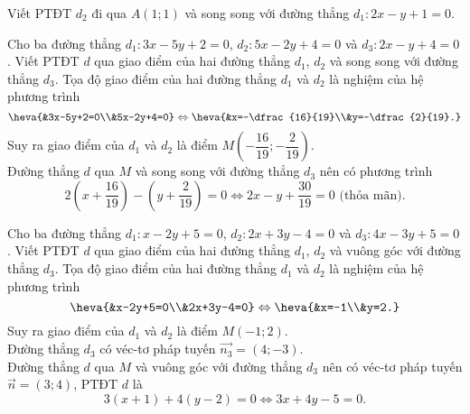 	\begin{bt}%
		Viết PTĐT $d_2$ đi qua $A\left(1;1\right)$ và song song với đường thẳng $d_1\colon 2x-y+1=0$.
	\end{bt}
	\begin{bt}%
		Cho ba đường thẳng $d_1\colon 3x-5y+2=0$, $d_2\colon 5x-2y+4=0$ và $d_3\colon 2x-y+4=0$. Viết PTĐT $d$ qua giao điểm của hai đường thẳng $d_1$, $d_2$ và song song với đường thẳng $d_3$.
		\loigiai
		{Tọa độ giao điểm của hai đường thẳng $d_1$ và $d_2$ là nghiệm của hệ phương trình 
			$$\heva{&3x-5y+2=0\\&5x-2y+4=0} \Leftrightarrow \heva{&x=-\dfrac{16}{19}\\&y=-\dfrac{2}{19}.}$$
			Suy ra giao điểm của $d_1$ và $d_2$ là điểm $M\left(-\dfrac{16}{19};-\dfrac{2}{19}\right)$.\\
			Đường thẳng $d$ qua $M$ và song song với đường thẳng $d_3$ nên có phương trình
			$$2\left(x+\dfrac{16}{19}\right)-\left(y+\dfrac{2}{19}\right)=0 \Leftrightarrow 2x-y+\dfrac{30}{19}=0 \text{ (thỏa mãn)}.$$}
	\end{bt}
	\begin{bt}%
		Cho ba đường thẳng $d_1\colon x-2y+5=0$, $d_2\colon 2x+3y-4=0$ và $d_3\colon 4x-3y+5=0$. Viết PTĐT $d$ qua giao điểm của hai đường thẳng $d_1$, $d_2$ và vuông góc với đường thẳng $d_3$.
		\loigiai
		{Tọa độ giao điểm của hai đường thẳng $d_1$ và $d_2$ là nghiệm của hệ phương trình 
			$$\heva{&x-2y+5=0\\&2x+3y-4=0} \Leftrightarrow \heva{&x=-1\\&y=2.}$$
			Suy ra giao điểm của $d_1$ và $d_2$ là điểm $M\left(-1;2\right)$.\\
			Đường thẳng $d_3$ có véc-tơ pháp tuyến $\overrightarrow{n_3}=(4;-3)$.\\
			Đường thẳng $d$ qua $M$ và vuông góc với đường thẳng $d_3$ nên có véc-tơ pháp tuyến $\overrightarrow{n}=(3;4)$, PTĐT $d$ là
			$$3\left(x+1\right)+4\left(y-2\right)=0 \Leftrightarrow 3x+4y-5=0.$$}
	\end{bt}
	
